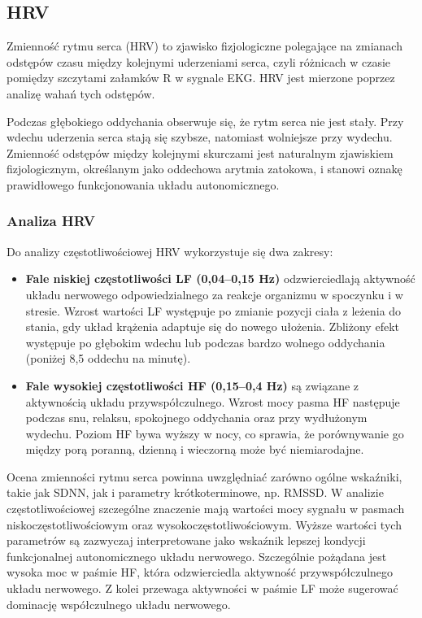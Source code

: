 \documentclass{article}
\begin{document}
\subsection{HRV}
Zmienność rytmu serca (HRV) to zjawisko fizjologiczne polegające na zmianach odstępów czasu między kolejnymi uderzeniami serca, czyli różnicach w czasie pomiędzy szczytami załamków R w sygnale EKG. HRV jest mierzone poprzez analizę wahań tych odstępów. 

Podczas głębokiego oddychania obserwuje się, że rytm serca nie jest stały. Przy wdechu uderzenia serca stają się szybsze, natomiast wolniejsze przy wydechu. Zmienność odstępów między kolejnymi skurczami jest naturalnym zjawiskiem fizjologicznym, określanym jako oddechowa arytmia zatokowa, i stanowi oznakę prawidłowego funkcjonowania układu autonomicznego.

\subsubsection{Analiza HRV}
Do analizy częstotliwościowej HRV wykorzystuje się dwa zakresy:
\begin{itemize}
\item \textbf{Fale niskiej częstotliwości LF (0,04–0,15 Hz)} odzwierciedlają aktywność układu nerwowego odpowiedzialnego za reakcje organizmu w spoczynku i w stresie. Wzrost wartości LF występuje po zmianie pozycji ciała z leżenia do stania, gdy układ krążenia adaptuje się do nowego ułożenia. Zbliżony efekt występuje po głębokim wdechu lub podczas bardzo wolnego oddychania (poniżej 8,5 oddechu na minutę).

\item \textbf{Fale wysokiej częstotliwości HF (0,15–0,4 Hz)} są związane z aktywnością układu przywspółczulnego. Wzrost mocy pasma HF następuje podczas snu, relaksu, spokojnego oddychania oraz przy wydłużonym wydechu. Poziom HF bywa wyższy w nocy, co sprawia, że porównywanie go między porą poranną, dzienną i wieczorną może być niemiarodajne.

\end{itemize}

\newpage
Ocena zmienności rytmu serca powinna uwzględniać zarówno ogólne wskaźniki, takie jak SDNN, jak i parametry krótkoterminowe, np. RMSSD. W analizie częstotliwościowej szczególne znaczenie mają wartości mocy sygnału w pasmach niskoczęstotliwościowym oraz wysokoczęstotliwościowym.
Wyższe wartości tych parametrów są zazwyczaj interpretowane jako wskaźnik lepszej kondycji funkcjonalnej autonomicznego układu nerwowego. Szczególnie pożądana jest wysoka moc w paśmie HF, która odzwierciedla aktywność przywspółczulnego układu nerwowego. Z kolei przewaga aktywności w paśmie LF może sugerować dominację współczulnego układu nerwowego.
\end{document}
